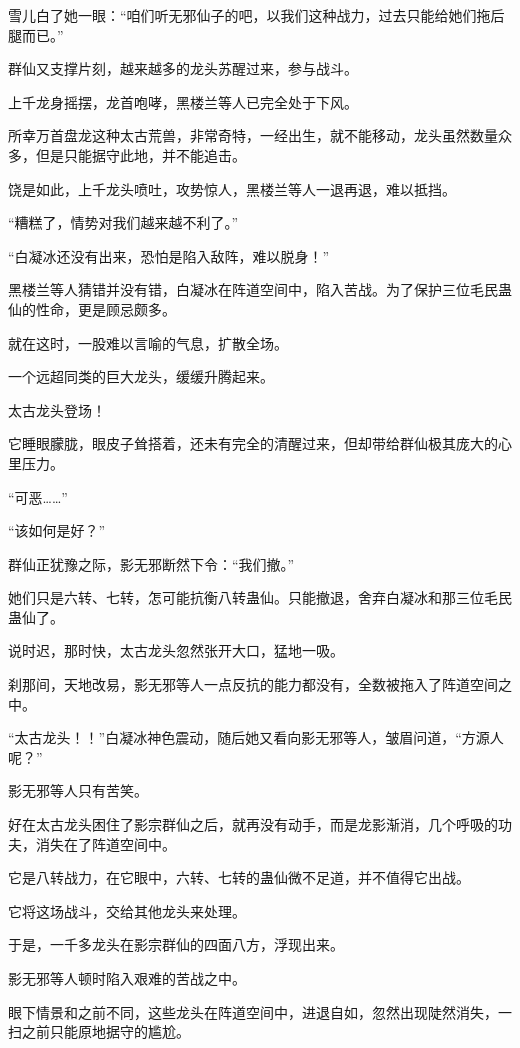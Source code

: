 \begin{this_body}
雪儿白了她一眼：“咱们听无邪仙子的吧，以我们这种战力，过去只能给她们拖后腿而已。”

群仙又支撑片刻，越来越多的龙头苏醒过来，参与战斗。

上千龙身摇摆，龙首咆哮，黑楼兰等人已完全处于下风。

所幸万首盘龙这种太古荒兽，非常奇特，一经出生，就不能移动，龙头虽然数量众多，但是只能据守此地，并不能追击。

饶是如此，上千龙头喷吐，攻势惊人，黑楼兰等人一退再退，难以抵挡。

“糟糕了，情势对我们越来越不利了。”

“白凝冰还没有出来，恐怕是陷入敌阵，难以脱身！”

黑楼兰等人猜错并没有错，白凝冰在阵道空间中，陷入苦战。为了保护三位毛民蛊仙的性命，更是顾忌颇多。

就在这时，一股难以言喻的气息，扩散全场。

一个远超同类的巨大龙头，缓缓升腾起来。

太古龙头登场！

它睡眼朦胧，眼皮子耸搭着，还未有完全的清醒过来，但却带给群仙极其庞大的心里压力。

“可恶……”

“该如何是好？”

群仙正犹豫之际，影无邪断然下令：“我们撤。”

她们只是六转、七转，怎可能抗衡八转蛊仙。只能撤退，舍弃白凝冰和那三位毛民蛊仙了。

说时迟，那时快，太古龙头忽然张开大口，猛地一吸。

刹那间，天地改易，影无邪等人一点反抗的能力都没有，全数被拖入了阵道空间之中。

“太古龙头！！”白凝冰神色震动，随后她又看向影无邪等人，皱眉问道，“方源人呢？”

影无邪等人只有苦笑。

好在太古龙头困住了影宗群仙之后，就再没有动手，而是龙影渐消，几个呼吸的功夫，消失在了阵道空间中。

它是八转战力，在它眼中，六转、七转的蛊仙微不足道，并不值得它出战。

它将这场战斗，交给其他龙头来处理。

于是，一千多龙头在影宗群仙的四面八方，浮现出来。

影无邪等人顿时陷入艰难的苦战之中。

眼下情景和之前不同，这些龙头在阵道空间中，进退自如，忽然出现陡然消失，一扫之前只能原地据守的尴尬。


\end{this_body}
